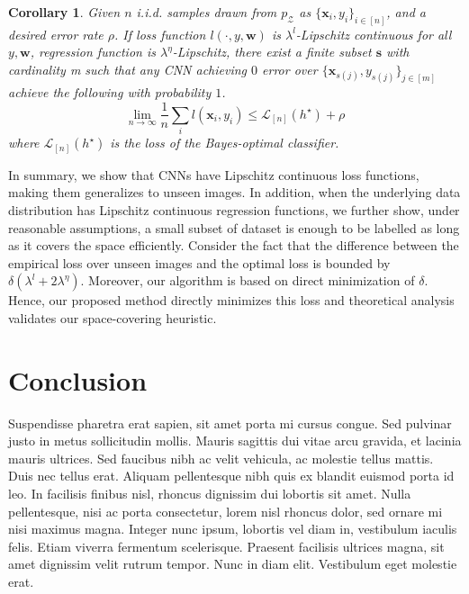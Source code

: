 \documentclass{article}
\newtheorem{cor}{Corollary}
\begin{document}
\begin{cor}
Given $n$ i.i.d. samples drawn from $p_\mathcal{Z}$ as $\{\mathbf{x}_i,y_i\}_{i\in[n]}$, and a desired error rate $\rho$. If loss function $l(\cdot,y,\mathbf{w})$ is $\lambda^l$-Lipschitz continuous for all $y, \mathbf{w}$, regression function is $\lambda^\eta$-Lipschitz, there exist a finite subset $\mathbf{s}$ with cardinality m such that any CNN achieving $0$ error over $\{\mathbf{x}_{s(j)},y_{s(j)}\}_{j \in [m]}$ achieve the following with probability $1$.
\[
\lim_{n \rightarrow \infty} \frac{1}{n}\sum_i l(\mathbf{x}_i,y_i) \leq \mathcal{L}_{[n]} (h^\star) +\rho
\]
where $\mathcal{L}_{[n]} (h^\star)$ is the loss of the Bayes-optimal classifier.
\label{maincor}
\end{cor}

In summary, we show that CNNs have Lipschitz continuous loss functions, making them generalizes to unseen images. In addition, when the underlying data distribution has Lipschitz continuous regression functions, we further show, under reasonable assumptions, a small subset of dataset is enough to be labelled as long as it covers the space efficiently. Consider the fact that the difference between the empirical loss over unseen images and the optimal loss is bounded by $\delta(\lambda^l + 2 \lambda^{\eta})$. Moreover, our algorithm is based on direct minimization of $\delta$. Hence, our proposed method directly minimizes this loss and theoretical analysis validates our space-covering heuristic.

\section{Conclusion}
Suspendisse pharetra erat sapien, sit amet porta mi cursus congue. Sed pulvinar justo in metus sollicitudin mollis. Mauris sagittis dui vitae arcu gravida, et lacinia mauris ultrices. Sed faucibus nibh ac velit vehicula, ac molestie tellus mattis. Duis nec tellus erat. Aliquam pellentesque nibh quis ex blandit euismod porta id leo. In facilisis finibus nisl, rhoncus dignissim dui lobortis sit amet. Nulla pellentesque, nisi ac porta consectetur, lorem nisl rhoncus dolor, sed ornare mi nisi maximus magna. Integer nunc ipsum, lobortis vel diam in, vestibulum iaculis felis. Etiam viverra fermentum scelerisque. Praesent facilisis ultrices magna, sit amet dignissim velit rutrum tempor. Nunc in diam elit. Vestibulum eget molestie erat. 

 

\end{document}
